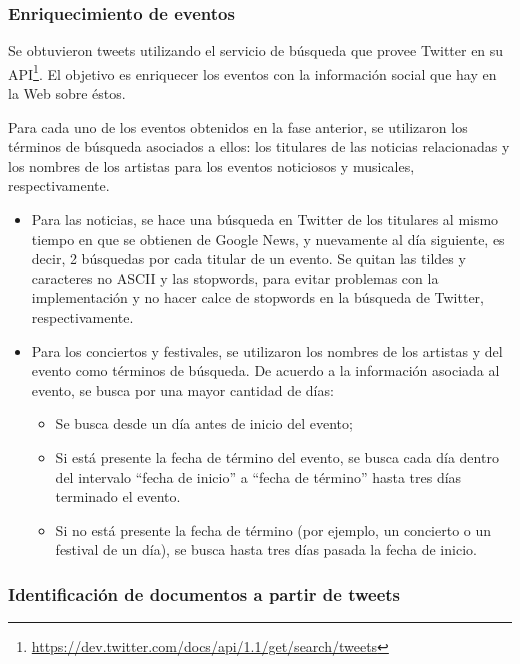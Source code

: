 \documentclass[upright, contnum]{umemoria}
\begin{document}
\subsubsection{Enriquecimiento de eventos}

Se obtuvieron tweets utilizando el servicio de búsqueda que provee
Twitter en su
API\footnote{\href{https://dev.twitter.com/docs/api/1.1/get/search/tweets}{https://dev.twitter.com/docs/api/1.1/get/search/tweets} }. El
objetivo es enriquecer los eventos con la información social que hay
en la Web sobre éstos. 

Para cada uno de los eventos obtenidos en la fase anterior, se
utilizaron los términos de búsqueda asociados a ellos: los titulares
de las noticias relacionadas y los nombres de los artistas para los
eventos noticiosos y musicales, respectivamente.

\begin{itemize}
\item Para las noticias, se hace una búsqueda en Twitter de los titulares
  al mismo tiempo en que se obtienen de Google News, y nuevamente al
  día siguiente, es decir, 2 búsquedas por cada titular de un evento.
  Se quitan las tildes y caracteres no ASCII y las stopwords, para
  evitar problemas con la implementación y no hacer calce de stopwords
  en la búsqueda de Twitter, respectivamente.
\item Para los conciertos y festivales, se utilizaron los nombres de los
  artistas y del evento como términos de búsqueda. De acuerdo a la
  información asociada al evento, se busca por una mayor cantidad de
  días:

\begin{itemize}
\item Se busca desde un día antes de inicio del evento;
\item Si está presente la fecha de término del evento, se busca cada día
    dentro del intervalo ``fecha de inicio'' a ``fecha de término'' hasta
    tres días terminado el evento.
\item Si no está presente la fecha de término (por ejemplo, un concierto
    o un festival de un día), se busca hasta tres días pasada la fecha
    de inicio.
\end{itemize}

\end{itemize}
\subsubsection{Identificación de documentos a partir de tweets}
\end{document}
